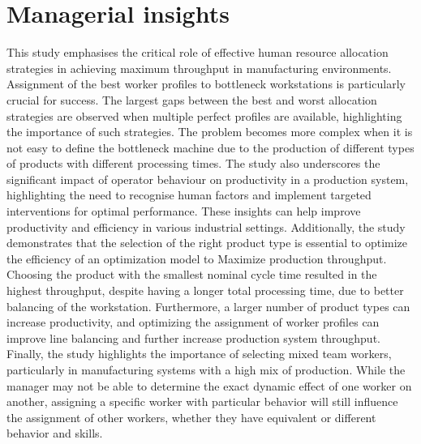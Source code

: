 \documentclass[review,12pt, 3p, times]{elsarticle}
\begin{document}
						       
					
\section{Managerial insights }\label{sec:mins}
This study emphasises the critical role of effective human resource allocation strategies in achieving maximum throughput in manufacturing environments. Assignment of the best worker profiles to bottleneck workstations is particularly crucial for success. The largest gaps between the best and worst allocation strategies are observed when multiple perfect profiles are available, highlighting the importance of such strategies. The problem becomes more complex when it is not easy to define the bottleneck machine due to the production of different types of products with different processing times.  
The study also underscores the significant impact of operator behaviour on productivity in a production system, highlighting the need to recognise human factors and implement targeted interventions for optimal performance. These insights can help improve productivity and efficiency in various industrial settings. Additionally, the study demonstrates that the selection of the right product type is essential to optimize the efficiency of an optimization model to Maximize production throughput. Choosing the product with the smallest nominal cycle time resulted in the highest throughput, despite having a longer total processing time, due to better balancing of the workstation. Furthermore, a larger number of product types can increase productivity, and optimizing the assignment of worker profiles can improve line balancing and further increase production system throughput. Finally, the study highlights the importance of selecting mixed team workers, particularly in manufacturing systems with a high mix of production. While the manager may not be able to determine the exact dynamic effect of one worker on another, assigning a specific worker with particular behavior will still influence the assignment of other workers, whether they have equivalent or different behavior and skills. 
			
					
\end{document}
